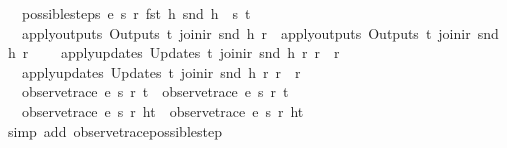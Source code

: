 \begin{isabellebody}
\ \ \ possible{\isacharunderscore}steps\ e{}\ s{}\ r{}\ {\isacharparenleft}fst\ h{\isacharparenright}\ {\isacharparenleft}snd\ h{\isacharparenright}\ {\isacharequal}\ {\isacharbraceleft}{\isacharbar}{\isacharparenleft}s{}{\isacharprime}{\isacharcomma}\ t{}{\isacharparenright}{\isacharbar}{\isacharbraceright}\ {\isasymLongrightarrow}\isanewline
\ \ \ apply{\isacharunderscore}outputs\ {\isacharparenleft}Outputs\ t{}{\isacharparenright}\ {\isacharparenleft}join{\isacharunderscore}ir\ {\isacharparenleft}snd\ h{\isacharparenright}\ r{}{\isacharparenright}\ {\isacharequal}\ apply{\isacharunderscore}outputs\ {\isacharparenleft}Outputs\ t{}{\isacharparenright}\ {\isacharparenleft}join{\isacharunderscore}ir\ {\isacharparenleft}snd\ h{\isacharparenright}\ r{}{\isacharparenright}\ {\isasymLongrightarrow}\isanewline
\ \ \ apply{\isacharunderscore}updates\ {\isacharparenleft}Updates\ t{}{\isacharparenright}\ {\isacharparenleft}join{\isacharunderscore}ir\ {\isacharparenleft}snd\ h{\isacharparenright}\ r{}{\isacharparenright}\ r{}\ {\isacharequal}\ r{}{\isacharprime}\ {\isasymLongrightarrow}\isanewline
\ \ \ apply{\isacharunderscore}updates\ {\isacharparenleft}Updates\ t{}{\isacharparenright}\ {\isacharparenleft}join{\isacharunderscore}ir\ {\isacharparenleft}snd\ h{\isacharparenright}\ r{}{\isacharparenright}\ r{}\ {\isacharequal}\ r{}{\isacharprime}\ {\isasymLongrightarrow}\isanewline
\ \ \ observe{\isacharunderscore}trace\ e{}\ s{}{\isacharprime}\ r{}{\isacharprime}\ t\ {\isacharequal}\ observe{\isacharunderscore}trace\ e{}\ s{}{\isacharprime}\ r{}{\isacharprime}\ t\ {\isasymLongrightarrow}\isanewline
\ \ \ observe{\isacharunderscore}trace\ e{}\ s{}\ r{}\ {\isacharparenleft}h{\isacharhash}t{\isacharparenright}\ {\isacharequal}\ observe{\isacharunderscore}trace\ e{}\ s{}\ r{}\ {\isacharparenleft}h{\isacharhash}t{\isacharparenright}{\isachardoublequoteclose}\isanewline
%
\isadelimproof
\ \ %
\endisadelimproof
%
\isatagproof
{}\isamarkupfalse%
\ {\isacharparenleft}simp\ add{\isacharcolon}\ observe{\isacharunderscore}trace{\isacharunderscore}possible{\isacharunderscore}step{\isacharparenright}%
\endisatagproof
{\isafoldproof}%
%
\isadelimproof
\isanewline
%
\endisadelimproof
\isanewline
{}\isamarkupfalse%

\end{isabellebody}
